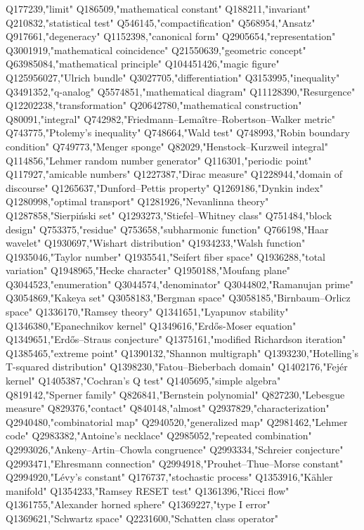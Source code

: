 Q177239,"limit"
Q186509,"mathematical constant"
Q188211,"invariant"
Q210832,"statistical test"
Q546145,"compactification"
Q568954,"Ansatz"
Q917661,"degeneracy"
Q1152398,"canonical form"
Q2905654,"representation"
Q3001919,"mathematical coincidence"
Q21550639,"geometric concept"
Q63985084,"mathematical principle"
Q104451426,"magic figure"
Q125956027,"Ulrich bundle"
Q3027705,"differentiation"
Q3153995,"inequality"
Q3491352,"q-analog"
Q5574851,"mathematical diagram"
Q11128390,"Resurgence"
Q12202238,"transformation"
Q20642780,"mathematical construction"
Q80091,"integral"
Q742982,"Friedmann–Lemaître–Robertson–Walker metric"
Q743775,"Ptolemy's inequality"
Q748664,"Wald test"
Q748993,"Robin boundary condition"
Q749773,"Menger sponge"
Q82029,"Henstock–Kurzweil integral"
Q114856,"Lehmer random number generator"
Q116301,"periodic point"
Q117927,"amicable numbers"
Q1227387,"Dirac measure"
Q1228944,"domain of discourse"
Q1265637,"Dunford–Pettis property"
Q1269186,"Dynkin index"
Q1280998,"optimal transport"
Q1281926,"Nevanlinna theory"
Q1287858,"Sierpiński set"
Q1293273,"Stiefel–Whitney class"
Q751484,"block design"
Q753375,"residue"
Q753658,"subharmonic function"
Q766198,"Haar wavelet"
Q1930697,"Wishart distribution"
Q1934233,"Walsh function"
Q1935046,"Taylor number"
Q1935541,"Seifert fiber space"
Q1936288,"total variation"
Q1948965,"Hecke character"
Q1950188,"Moufang plane"
Q3044523,"enumeration"
Q3044574,"denominator"
Q3044802,"Ramanujan prime"
Q3054869,"Kakeya set"
Q3058183,"Bergman space"
Q3058185,"Birnbaum–Orlicz space"
Q1336170,"Ramsey theory"
Q1341651,"Lyapunov stability"
Q1346380,"Epanechnikov kernel"
Q1349616,"Erdős-Moser equation"
Q1349651,"Erdős–Straus conjecture"
Q1375161,"modified Richardson iteration"
Q1385465,"extreme point"
Q1390132,"Shannon multigraph"
Q1393230,"Hotelling's T-squared distribution"
Q1398230,"Fatou–Bieberbach domain"
Q1402176,"Fejér kernel"
Q1405387,"Cochran's Q test"
Q1405695,"simple algebra"
Q819142,"Sperner family"
Q826841,"Bernstein polynomial"
Q827230,"Lebesgue measure"
Q829376,"contact"
Q840148,"almost"
Q2937829,"characterization"
Q2940480,"combinatorial map"
Q2940520,"generalized map"
Q2981462,"Lehmer code"
Q2983382,"Antoine's necklace"
Q2985052,"repeated combination"
Q2993026,"Ankeny–Artin–Chowla congruence"
Q2993334,"Schreier conjecture"
Q2993471,"Ehresmann connection"
Q2994918,"Prouhet–Thue–Morse constant"
Q2994920,"Lévy's constant"
Q176737,"stochastic process"
Q1353916,"Kähler manifold"
Q1354233,"Ramsey RESET test"
Q1361396,"Ricci flow"
Q1361755,"Alexander horned sphere"
Q1369227,"type I error"
Q1369621,"Schwartz space"
Q2231600,"Schatten class operator"

